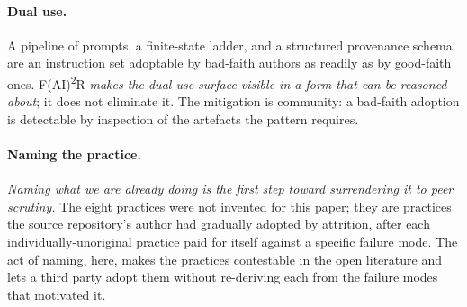 \paragraph{Dual use.}
A pipeline of prompts, a finite-state ladder, and a structured
provenance schema are an instruction set adoptable by bad-faith
authors as readily as by good-faith ones.
F(AI)\textsuperscript{2}R \emph{makes the dual-use surface visible
in a form that can be reasoned about}; it does not eliminate it.
The mitigation is community: a bad-faith adoption is detectable by
inspection of the artefacts the pattern requires.

\paragraph{Naming the practice.}
\emph{Naming what we are already doing is the first step toward
surrendering it to peer scrutiny.} The eight practices were not
invented for this paper; they are practices the source repository's
author had gradually adopted by attrition, after each
individually-unoriginal practice paid for itself against a specific
failure mode. The act of naming, here, makes the practices
contestable in the open literature and lets a third party adopt
them without re-deriving each from the failure modes that motivated
it.
